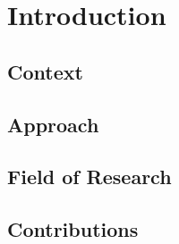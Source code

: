 \chapter{Introduction}

\section{Context}

\section{Approach}

\section{Field of Research}
\section{Contributions}